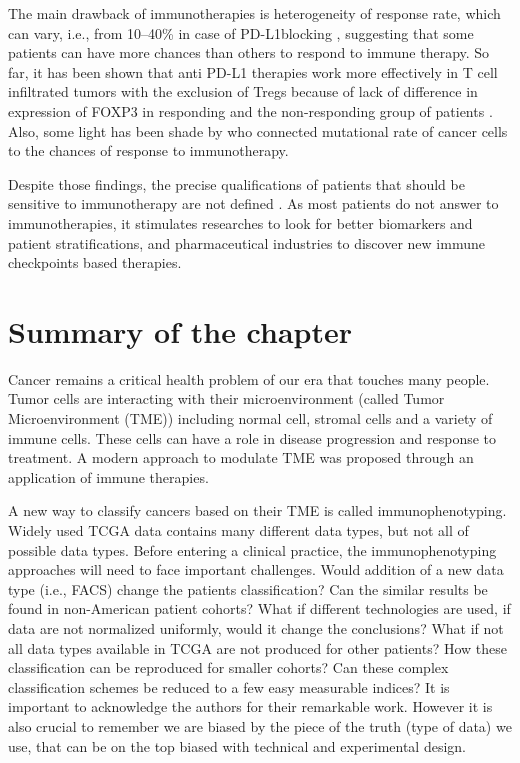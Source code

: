 \documentclass[12pt,]{book}
\theoremstyle{definition}
\theoremstyle{definition}
\theoremstyle{definition}
\theoremstyle{remark}
\begin{document}
The main drawback of immunotherapies is heterogeneity of response rate,
which can vary, i.e., from 10--40\% in case of PD-L1blocking
\citep{Zou2016}, suggesting that some patients can have more chances
than others to respond to immune therapy. So far, it has been shown that
anti PD-L1 therapies work more effectively in T cell infiltrated tumors
with the exclusion of Tregs because of lack of difference in expression
of FOXP3 in responding and the non-responding group of patients
\citep{Herbst2014}. Also, some light has been shade by \citet{Rizvi2015}
who connected mutational rate of cancer cells to the chances of response
to immunotherapy.

Despite those findings, the precise qualifications of patients that
should be sensitive to immunotherapy are not defined \citep{Pitt2016}.
As most patients do not answer to immunotherapies, it stimulates
researches to look for better biomarkers and patient stratifications,
and pharmaceutical industries to discover new immune checkpoints based
therapies.

\hypertarget{summary-of-the-chapter}{%
\section{Summary of the chapter}\label{summary-of-the-chapter}}

Cancer remains a critical health problem of our era that touches many
people. Tumor cells are interacting with their microenvironment (called
Tumor Microenvironment (TME)) including normal cell, stromal cells and a
variety of immune cells. These cells can have a role in disease
progression and response to treatment. A modern approach to modulate TME
was proposed through an application of immune therapies.

A new way to classify cancers based on their TME is called
immunophenotyping. Widely used TCGA data contains many different data
types, but not all of possible data types. Before entering a clinical
practice, the immunophenotyping approaches will need to face important
challenges. Would addition of a new data type (i.e., FACS) change the
patients classification? Can the similar results be found in
non-American patient cohorts? What if different technologies are used,
if data are not normalized uniformly, would it change the conclusions?
What if not all data types available in TCGA are not produced for other
patients? How these classification can be reproduced for smaller
cohorts? Can these complex classification schemes be reduced to a few
easy measurable indices? It is important to acknowledge the authors for
their remarkable work. However it is also crucial to remember we are
biased by the piece of the truth (type of data) we use, that can be on
the top biased with technical and experimental design.
\end{document}
